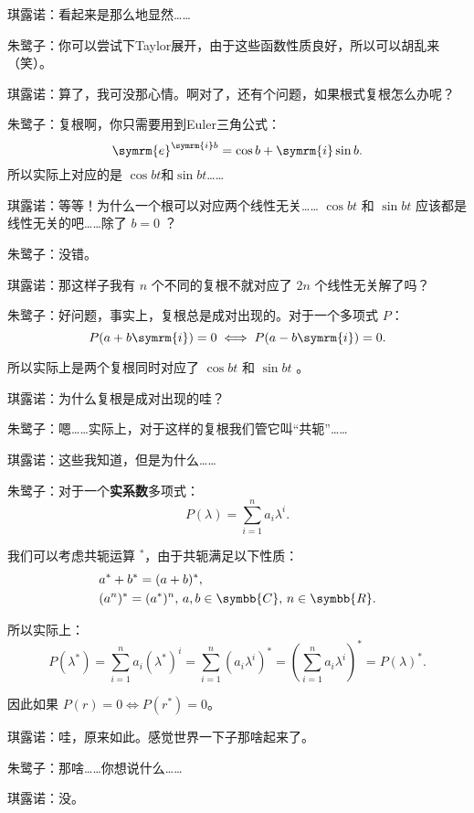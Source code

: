 琪露诺：看起来是那么地显然……

朱鹭子：你可以尝试下Taylor展开，由于这些函数性质良好，所以可以胡乱来（笑）。

琪露诺：算了，我可没那心情。啊对了，还有个问题，如果根式复根怎么办呢？

朱鹭子：复根啊，你只需要用到Euler三角公式：
\[
	\symrm{e} ^{\symrm{i} b}=\cos b+\symrm{i} \sin b
	.\]
所以实际上对应的是 \(\cos bt\)和\(\sin bt\)……

琪露诺：等等！为什么一个根可以对应两个线性无关…… \(\cos bt\) 和 \(\sin bt\) 应该都是线性无关的吧……除了 \(b=0\) ？

朱鹭子：没错。

琪露诺：那这样子我有 \(n\) 个不同的复根不就对应了 \(2n\) 个线性无关解了吗？

朱鹭子：好问题，事实上，复根总是成对出现的。对于一个多项式 \(P\)：
\[
	P(a +b\symrm{i}  )=0 \iff P(a-b\symrm{i} )=0
	.\]

所以实际上是两个复根同时对应了 \(\cos bt\) 和 \(\sin bt\) 。

琪露诺：为什么复根是成对出现的哇？

朱鹭子：嗯……实际上，对于这样的复根我们管它叫“共轭”……

琪露诺：这些我知道，但是为什么……

朱鹭子：对于一个\textbf{实系数}多项式：
\[
	P(\lambda ) = \sum_{i=1}^{n} a_i \lambda ^i
	.\]

我们可以考虑共轭运算 \(^*\)，由于共轭满足以下性质：
\[
	\begin{aligned}
		 & a^*+b^*=(a+b)^*,                                     \\
		 & (a^n)^*=(a^*)^n,\,a,b\in\symbb{C} ,\,n\in\symbb{R} .
	\end{aligned}
\]

所以实际上：
\[
	P(\lambda^* ) = \sum_{i=1}^{n} a_i (\lambda^* )^i  = \sum_{i=1}^{n}  (a_i\lambda^i ) ^*=\left( \sum_{i=1}^{n}  a_i\lambda^i \right) ^*=P(\lambda )^*
	.\]

因此如果 \(P(r)=0 \iff P(r^*)=0\)。

琪露诺：哇，原来如此。感觉世界一下子那啥起来了。

朱鹭子：那啥……你想说什么……

琪露诺：没。